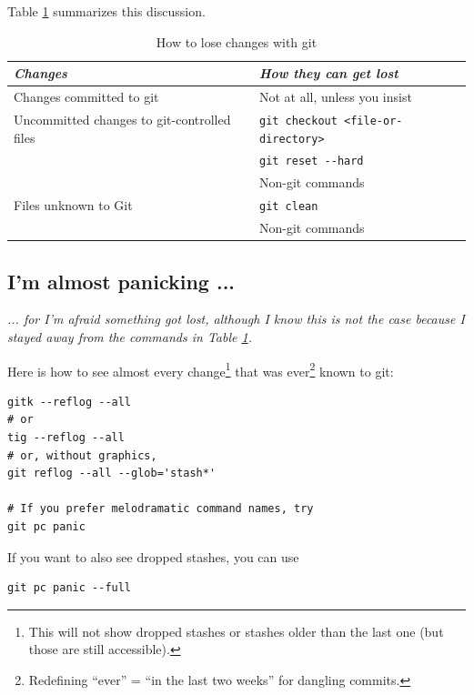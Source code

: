 \documentclass[12pt,pdftex]{article}
\begin{document}
Table \ref{Table:How-to-lose-changes} summarizes this discussion.

\begin{table}[htb]
\caption{\label{Table:How-to-lose-changes}How to lose changes with git}
\centering
\begin{tabular}{ll}
\toprule
\emph{Changes} & \emph{How they can get lost}\\
\midrule
Changes committed to git & Not at all, unless you insist \footnotemark\\
\midrule
Uncommitted changes to git-controlled files & \texttt{git checkout <file-or-directory>}\\
 & \texttt{git reset -{}-hard}\\
 & Non-git commands\\
\midrule
Files unknown to Git & \texttt{git clean}\\
 & Non-git commands\\
\bottomrule
\end{tabular}
\end{table}


\subsection{I'm almost panicking ...}
\label{sec-3-1}
\label{Section-almost-panicking}

\emph{
... for I'm afraid something got lost, although I know this is not the
case because I stayed away from the commands in Table
\ref{Table:How-to-lose-changes}.
}

\bigskip

Here is how to see almost every change\footnote{This will not show dropped stashes or stashes older than the last
one (but those are still accessible).} that was ever\footnote{Redefining “ever” = “in the last two weeks” for dangling commits.}
known to git:
\lstset{frame=single,basicstyle=\ttfamily\footnotesize,language=sh,label= ,caption= ,captionpos=b,numbers=none}
\begin{lstlisting}
gitk --reflog --all
# or
tig --reflog --all
# or, without graphics,
git reflog --all --glob='stash*'

# If you prefer melodramatic command names, try
git pc panic
\end{lstlisting}

If you want to also see dropped stashes, you can use
\lstset{frame=single,basicstyle=\ttfamily\footnotesize,language=sh,label= ,caption= ,captionpos=b,numbers=none}
\begin{lstlisting}
git pc panic --full
\end{lstlisting}
\end{document}
